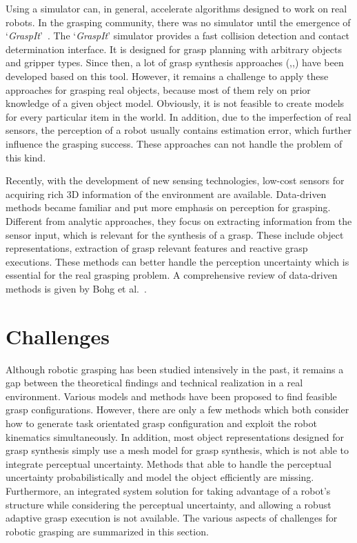 Using a simulator can, in general, accelerate algorithms designed to work on real robots. In the grasping community, there was no simulator until the emergence of `\textit{GraspIt}'~\cite{Miller2004}.  The `\textit{GraspIt}' simulator provides a fast collision detection and contact determination interface. It is designed for grasp planning with arbitrary objects and gripper types. Since then, a lot of grasp synthesis approaches (\cite{Miller1999},\cite{Kragic2001},\cite{Miller2003}) have been developed based on this tool. However, it remains a challenge to apply these approaches for grasping real objects, because most of them rely on prior knowledge of a given object model. Obviously, it is not feasible to create models  for every particular item in the world. In addition, due to the imperfection of real sensors, the perception of a robot usually contains estimation error, which further influence the grasping success. These approaches can not handle the problem of this kind.

Recently, with the development of new sensing technologies, low-cost sensors for acquiring rich 3D information of the environment are available. Data-driven methods became familiar and put more emphasis on perception for grasping. Different from analytic approaches, they focus on extracting information from the sensor input, which is relevant for the synthesis of a grasp. These include object representations, extraction of grasp relevant features and reactive grasp executions. These methods can better handle the perception uncertainty which is essential for the real grasping problem. A comprehensive review of data-driven methods is given by Bohg et al.~\cite{Bohg2014}.

 
\section{Challenges}
Although robotic grasping has been studied intensively in the past, it remains a gap between the theoretical findings and technical realization in a real environment. Various models and methods have been proposed to  find feasible grasp configurations. However, there are only a few methods which both consider how to generate task orientated grasp configuration and exploit the robot kinematics simultaneously. In addition, most object representations designed for grasp synthesis simply use a mesh model for grasp synthesis, which is not able to integrate perceptual uncertainty. Methods that able to handle the perceptual uncertainty probabilistically and model the object efficiently are missing. Furthermore, an integrated system solution for taking advantage of a robot's structure while considering the perceptual uncertainty, and allowing a robust adaptive grasp execution is not available. The various aspects of challenges for robotic grasping are summarized in this section. 

